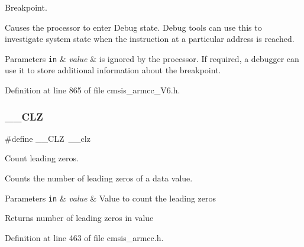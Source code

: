 Breakpoint. 

Causes the processor to enter Debug state. Debug tools can use this to investigate system state when the instruction at a particular address is reached. 
\begin{DoxyParams}[1]{Parameters}
\mbox{\tt in}  & {\em value} & is ignored by the processor. If required, a debugger can use it to store additional information about the breakpoint. \\
\hline
\end{DoxyParams}


Definition at line 865 of file cmsis\+\_\+armcc\+\_\+\+V6.\+h.

\mbox{\label{group___c_m_s_i_s___core___instruction_interface_ga5d5bb1527e042be4a9fa5a33f65cc248}} 
\subsubsection{\texorpdfstring{\+\_\+\+\_\+\+C\+LZ}{\_\_CLZ}\hspace{0.1cm}{\footnotesize\ttfamily [1/3]}}
{\footnotesize\ttfamily \#define \+\_\+\+\_\+\+C\+LZ~\+\_\+\+\_\+clz}



Count leading zeros. 

Counts the number of leading zeros of a data value. 
\begin{DoxyParams}[1]{Parameters}
\mbox{\tt in}  & {\em value} & Value to count the leading zeros \\
\hline
\end{DoxyParams}
\begin{DoxyReturn}{Returns}
number of leading zeros in value 
\end{DoxyReturn}


Definition at line 463 of file cmsis\+\_\+armcc.\+h.

\mbox{\label{group___c_m_s_i_s___core___instruction_interface_ga5d5bb1527e042be4a9fa5a33f65cc248}} 
